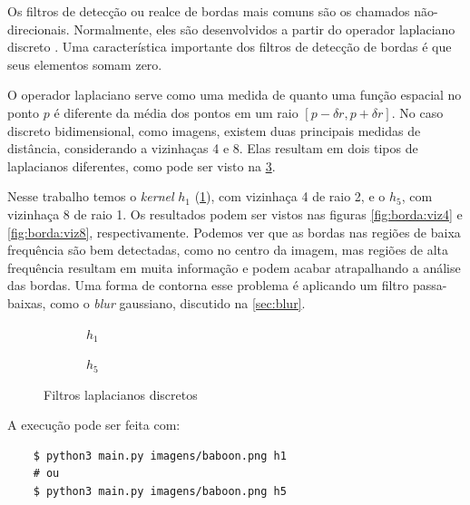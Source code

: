 Os filtros de detecção ou realce de bordas mais comuns são os chamados não-direcionais. Normalmente, eles são desenvolvidos a partir do operador laplaciano discreto \autocite{ref:laplacian}. Uma característica importante dos filtros de detecção de bordas é que seus elementos somam zero.

O operador laplaciano serve como uma medida de quanto uma função espacial no ponto $p$ é diferente da média dos pontos em um raio $[p - \delta r, p + \delta r]$. No caso discreto bidimensional, como imagens, existem duas principais medidas de distância, considerando a vizinhaças 4 e 8. Elas resultam em dois tipos de laplacianos diferentes, como pode ser visto na \cref{fig:borda:kernel}.

Nesse trabalho temos o \textit{kernel} $h_1$ (\ref{fig:h1}), com vizinhaça 4 de raio 2, e o $h_5$, com vizinhaça 8 de raio 1. Os resultados podem ser vistos nas figuras \ref{fig:borda:viz4} e \ref{fig:borda:viz8}, respectivamente. Podemos ver que as bordas nas regiões de baixa frequência são bem detectadas, como no centro da imagem, mas regiões de alta frequência resultam em muita informação e podem acabar atrapalhando a análise das bordas. Uma forma de contorna esse problema é aplicando um filtro passa-baixas, como o \textit{blur} gaussiano, discutido na \cref{sec:blur}.

\begin{figure}[H]
    \centering
    \begin{subfigure}{0.4\textwidth}
        \centering
        
        \caption{~$h_1$}
        \label{fig:h1}
    \end{subfigure}%
    \begin{subfigure}{0.4\textwidth}
        \centering
        
        \caption{~$h_5$}
        \label{fig:h5}
    \end{subfigure}

    \caption{Filtros laplacianos discretos}
    \label{fig:borda:kernel}
\end{figure}

A execução pode ser feita com:

\begin{verbatim}
    $ python3 main.py imagens/baboon.png h1
    # ou
    $ python3 main.py imagens/baboon.png h5
\end{verbatim}
